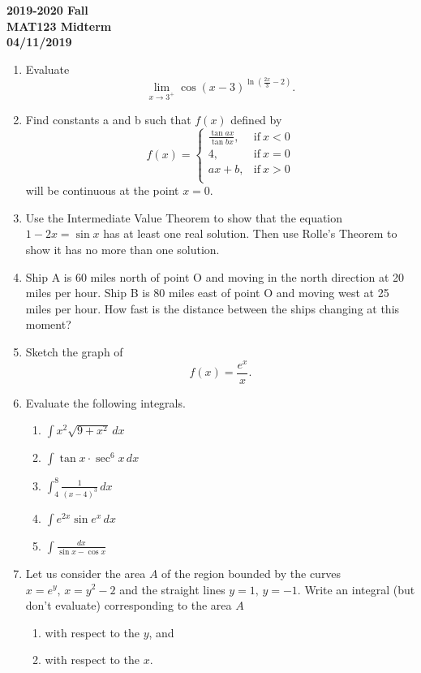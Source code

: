 \documentclass[a4paper, 12pt]{article}
\begin{document}
\pagestyle{empty}

\begin{center}
\textbf{2019-2020 Fall\\MAT123 Midterm\\04/11/2019}
\end{center}

\begin{enumerate}[leftmargin=*,label=\textbf{\arabic*.}]
\item Evaluate
\[\lim_{x\to3^+}\cos(x-3)^{\ln\left(\frac{2x}{3}-2\right)}.\]

\item Find constants a and b such that $f(x)$ defined by
\[
f(x) =
\begin{cases}
\displaystyle \frac{\tan ax}{\tan bx}, & \text{if}\ x < 0 \\[1em]
4, & \text{if}\ x = 0 \\[1em]
ax+b, & \text{if}\ x >0 \\
\end{cases}
\]
will be continuous at the point $x=0$.

\item Use the Intermediate Value Theorem to show that the equation $1-2x =\sin x$ has at least one real solution. Then use Rolle's Theorem to show it has no more than one solution.

\item Ship A is 60 miles north of point O and moving in the north direction at 20 miles per hour. Ship B is 80 miles east of point O and moving west at 25 miles per hour. How fast is the distance between the ships changing at this moment?

\item Sketch the graph of
\[f(x)=\frac{e^x}{x}.\]

\item Evaluate the following integrals.
\begin{enumerate}[leftmargin=*,label=\textbf{\alph*.}]
\item $\displaystyle\int x^2\sqrt{9+x^2}\,dx$
\item $\displaystyle\int\tan x\cdot\sec^6x\,dx$
\item $\displaystyle\int_4^8\frac{1}{(x-4)^3}\,dx$
\item $\displaystyle\int e^{2x}\sin e^x\,dx$
\item $\displaystyle\int\frac{dx}{\sin x-\cos x}$
\end{enumerate}

\item Let us consider the area $A$ of the region bounded by the curves $x= e^y,\,x=y^2-2$ and the straight lines $y=1,\,y=-1$. Write an integral (but don't evaluate) corresponding to the area $A$
\begin{enumerate}[leftmargin=*,label=\textbf{\roman*.}]
\item with respect to the $y$, and
\item with respect to the $x$.
\end{enumerate}
\end{enumerate}
\end{document}
